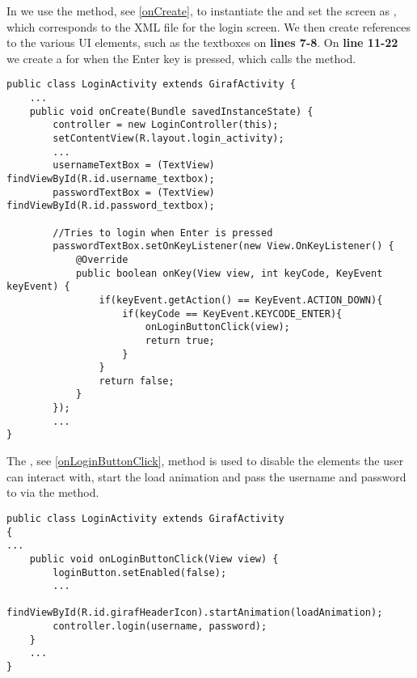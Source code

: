 In  we use the  method, see
\autoref{onCreate}, to instantiate the  and set the
screen as , which corresponds to the XML
file for the login screen. We then create references to the various UI elements,
such as the textboxes on \textbf{lines 7-8}. On \textbf{line 11-22} we create a
 for when the Enter key is pressed, which calls the
 method.\nl

\begin{minipage}[H]{\linewidth}
\begin{lstlisting}[caption = Creating the correct references when logging in,
label = onCreate] public class LoginActivity extends GirafActivity {
	...
	public void onCreate(Bundle savedInstanceState) {
		controller = new LoginController(this);
    	setContentView(R.layout.login_activity);
		...
        usernameTextBox = (TextView) findViewById(R.id.username_textbox);
        passwordTextBox = (TextView) findViewById(R.id.password_textbox);
        
        //Tries to login when Enter is pressed
        passwordTextBox.setOnKeyListener(new View.OnKeyListener() {
            @Override
            public boolean onKey(View view, int keyCode, KeyEvent keyEvent) {
                if(keyEvent.getAction() == KeyEvent.ACTION_DOWN){
                    if(keyCode == KeyEvent.KEYCODE_ENTER){
                        onLoginButtonClick(view);
                        return true;
                    }
                }
                return false;
            }
        });
        ...
}
\end{lstlisting}
\end{minipage}

The , see \autoref{onLoginButtonClick}, method is used
to disable the elements the user can interact with, start the load animation and
pass the username and password to  via the 
method.\nl

\begin{minipage}[H]{\linewidth}
\begin{lstlisting}[caption = Passes the user information and begins the waiting animation, label = onLoginButtonClick] 
public class LoginActivity extends GirafActivity 
{ 
...
	public void onLoginButtonClick(View view) {
        loginButton.setEnabled(false);
 		...
        findViewById(R.id.girafHeaderIcon).startAnimation(loadAnimation);
        controller.login(username, password);
    }
	...
}
\end{lstlisting}
\end{minipage}

